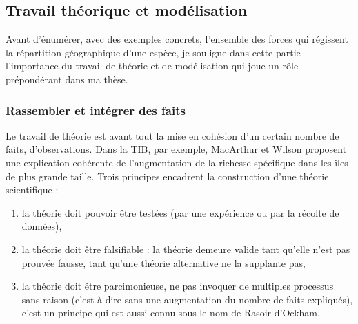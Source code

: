 \subsection*{Travail théorique et
modélisation}\label{travail-thuxe9orique-et-moduxe9lisation}

Avant d'énumérer, avec des exemples concrets, l'ensemble des forces qui
régissent la répartition géographique d'une espèce, je souligne dans
cette partie l'importance du travail de théorie et de modélisation qui
joue un rôle prépondérant dans ma thèse.

\subsubsection*{Rassembler et intégrer des
faits}\label{rassembler-et-intuxe9grer-des-faits}

Le travail de théorie est avant tout la mise en cohésion d'un certain
nombre de faits, d'observations. Dans la TIB, par exemple, MacArthur et
Wilson proposent une explication cohérente de l'augmentation de la
richesse spécifique dans les îles de plus grande taille. Trois principes
encadrent la construction d'une théorie scientifique :

\begin{enumerate}
\def\labelenumi{\arabic{enumi}.}
\tightlist
\item
  la théorie doit pouvoir être testées (par une expérience ou par la
  récolte de données),\\
\item
  la théorie doit être falsifiable : la théorie demeure valide tant
  qu'elle n'est pas prouvée fausse, tant qu'une théorie alternative ne
  la supplante pas,\\
\item
  la théorie doit être parcimonieuse, ne pas invoquer de multiples
  processus sans raison (c'est-à-dire sans une augmentation du nombre de
  faits expliqués), c'est un principe qui est aussi connu sous le nom de
  Rasoir d'Ockham.
\end{enumerate}

